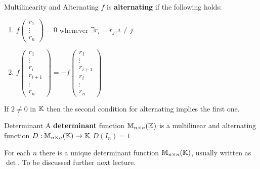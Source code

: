 \begin{definition} {Multilinearity and Alternating}
    \(f\) is \textbf{alternating} if the following holds:
    \begin{enumerate}
        \item \(f \left(\begin{array}{c}
            r_1 \\ \vdots \\ r_n
            \end{array}\right) = 0\) whenever \(\exists r_i = r_j, i \neq j\)
            \item \(f \left(\begin{array}{c}
            r_1 \\ \vdots \\ r_i \\ r_{i+1}\\ \vdots \\ r_n
            \end{array}\right) = -f \left(\begin{array}{c}
                r_1 \\ \vdots \\ r_{i+1}\\ r_i \\ \vdots \\ r_n
                \end{array}\right) \) 
    \end{enumerate}
\end{definition}

\begin{remark}
    If \(2 \neq 0\) in \(\mathbb{K}\) then the second condition for alternating implies the first one.
\end{remark}

\begin{definition} {Determinant}
    A \textbf{determinant} function \(\mathbb{M}_{n \times n}(\mathbb{K})\) is a multilinear and alternating function \(D: \mathbb{M}_{n \times n}(\mathbb{K}) \to \mathbb{K}\) \st \(D(I_n) = 1\)
\end{definition}

\begin{remark}
    For each \(n\) there is a unique determinant function \(\mathbb{M}_{n\times n}(\mathbb{K})\), usually written as \(\det\). To be discussed further next lecture.
\end{remark}